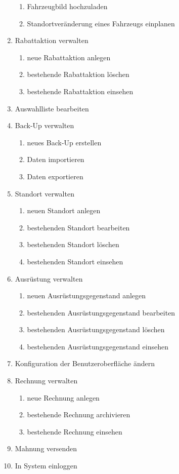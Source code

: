 \begin{enumerate}
\begin{enumerate}[itemsep= -0.25 cm]
        \item Fahrzeugbild hochzuladen
        \item Standortveränderung eines Fahrzeugs einplanen
    \end{enumerate}
    \item Rabattaktion verwalten
    \begin{enumerate}[itemsep= -0.25 cm]
        \item neue Rabattaktion anlegen
        \item bestehende Rabattaktion löschen
        \item bestehende Rabattaktion einsehen
    \end{enumerate}
    \item Auswahlliste bearbeiten
    \item Back-Up verwalten
    \begin{enumerate}[itemsep= -0.25 cm]
        \item neues Back-Up erstellen
        \item Daten importieren
        \item Daten exportieren
    \end{enumerate}
    \item Standort verwalten
    \begin{enumerate}[itemsep= -0.25 cm]
        \item neuen Standort anlegen
        \item bestehenden Standort bearbeiten
        \item bestehenden Standort löschen
        \item bestehenden Standort einsehen
    \end{enumerate}
    \item Ausrüstung verwalten
    \begin{enumerate}[itemsep= -0.25 cm]
        \item neuen Ausrüstungsgegenstand anlegen
        \item bestehenden Ausrüstungsgegenstand bearbeiten
        \item bestehenden Ausrüstungsgegenstand löschen
        \item bestehenden Ausrüstungsgegenstand einsehen
    \end{enumerate}
    \item Konfiguration der Benutzeroberfläche ändern
    \item Rechnung verwalten
    \begin{enumerate}[itemsep= -0.25 cm]
        \item neue Rechnung anlegen
        \item bestehende Rechnung archivieren
        \item bestehende Rechnung einsehen
    \end{enumerate}
    \item Mahnung versenden
    \item In System einloggen
\end{enumerate}

